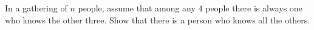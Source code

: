 In a gathering of $n$ people, assume that among any $4$ people there is always one who knows the other three. Show that there is a person who knows all the others.
